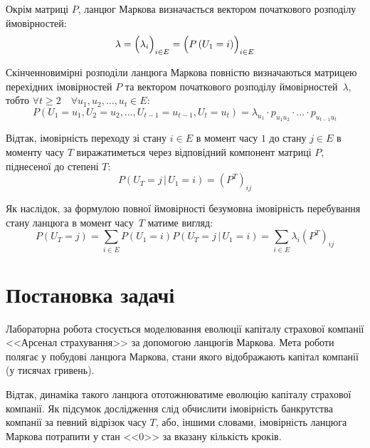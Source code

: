 \documentclass{mathreport}
\begin{document}
Окрім матриці $P$, ланцюг Маркова визначається вектором початкового розподілу ймовірностей:
\begin{equation}\label{eq: initial distribution}
    \lambda = \Bigl( \lambda_i \Bigr)_{i \in E} = \Bigl( P\left( U_{1} = i \right) \Bigr)_{i \in E}
\end{equation}

Скінченновимірні розподіли ланцюга Маркова повністю визначаються матрицею перехідних імовірностей $P$ та вектором початкового розподілу ймовірностей~$\lambda$, тобто $\forall t\geqslant 2 \quad \forall u_1,u_2,\ldots,u_{t} \in E:$
\begin{equation}\label{eq: finite-dimensional distributions}
    P\left( U_{1}=u_{1},U_{2}=u_{2},\ldots,U_{t-1}=u_{t-1},U_{t}=u_{t} \right) = \lambda_{u_1} \cdot p_{u_1 u_2} \cdot \ldots \cdot p_{u_{t-1}u_{t}} 
\end{equation}

Відтак, імовірність переходу зі стану $i \in E$ в момент часу $1$ до стану $j \in E$ в моменту часу $T$ виражатиметься через відповідний компонент матриці $P$, піднесеної до степені $T:$
\begin{equation}\label{eq: from t=1 to t=T}
    P\left( U_{T}=j \,|\,U_{1}=i \right) = \left( P^{T} \right)_{ij}
\end{equation}

Як наслідок, за формулою повної ймовірності безумовна імовірність перебування стану ланцюга в момент часу~$T$ матиме вигляд:
\begin{equation}\label{eq: point state probability}
    P\left( U_{T}=j \right) = \sum\limits_{i \in E} P\left( U_1=i \right) P\left( U_T=j \,|\, U_1=i \right) = \sum\limits_{i \in E} \lambda_i \left( P^{T} \right)_{ij}
\end{equation}

\section*{Постановка задачі}

Лабораторна робота стосується моделювання еволюції капіталу страхової компанії <<Арсенал страхування>> за допомогою ланцюгів Маркова. Мета роботи полягає у побудові ланцюга Маркова, стани якого відображають капітал компанії (у тисячах гривень). 

Відтак, динаміка такого ланцюга ототожнюватиме еволюцію капіталу страхової компанії. Як підсумок дослідження слід обчислити імовірність банкрутства компанії за певний відрізок часу $T$, або, іншими словами, імовірність ланцюга Маркова потрапити у стан <<0>> за вказану кількість кроків. 
\end{document}
